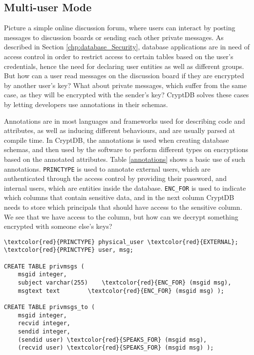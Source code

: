 \subsection{Multi-user Mode}
Picture a simple online discussion forum, where users can interact by posting messages to discussion boards or sending each other private messages. As described in Section \ref{chp:database_Security}, database applications are in need of access control in order to restrict access to certain tables based on the user's credentials, hence the need for declaring user entities as well as different groups. But how can a user read messages on the discussion board if they are encrypted by another user's key? What about private messages, which suffer from the same case, as they will be encrypted with the sender's key? CryptDB solves these cases by letting developers use annotations in their schemas.


Annotations are in most languages and frameworks used for describing code and attributes, as well as inducing different behaviours, and are usually parsed at compile time. In CryptDB, the annotations is used when creating database schemas, and then used by the software to perform different types on encryptions based on the annotated attributes. Table \ref{annotations} shows a basic use of such annotations. \verb!PRINCTYPE! is used to annotate external users, which are authenticated through the access control by providing their password, and internal users, which are entities inside the database. \verb!ENC_FOR! is used to indicate which columns that contain sensitive data, and in the next column CryptDB needs to store which principals that should have access to the sensitive column. We see that we have access to the column, but how can we decrypt something encrypted with someone else's keys?

\begin{table}[h]
\begin{Verbatim}[frame=single]
\textcolor{red}{PRINCTYPE} physical_user \textcolor{red}{EXTERNAL};
\textcolor{red}{PRINCTYPE} user, msg;

CREATE TABLE privmsgs (
	msgid integer,
	subject varchar(255)	\textcolor{red}{ENC_FOR} (msgid msg),
	msgtext text		\textcolor{red}{ENC_FOR} (msgid msg) );

CREATE TABLE privmsgs_to (
	msgid integer,
	recvid integer,
	sendid integer,
	(sendid user) \textcolor{red}{SPEAKS_FOR} (msgid msg),
	(recvid user) \textcolor{red}{SPEAKS_FOR} (msgid msg) ); 
\end{Verbatim}
\caption{Use of policy annotations in database schemas when creating multi-user applications. Annotations are highlighted in red.}
\label{annotations}
\end{table}

